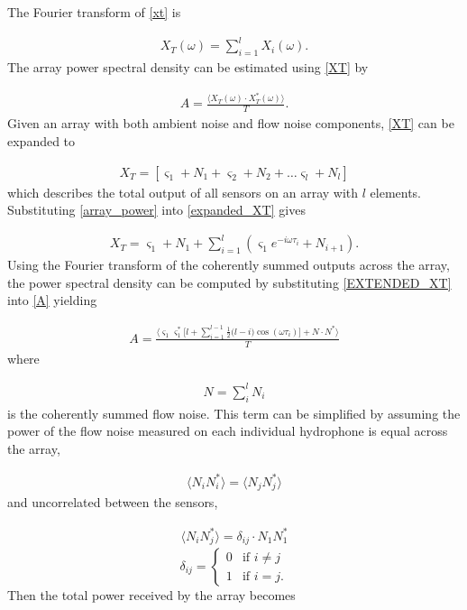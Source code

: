 \documentclass[12pt,journal,onecolumn]{IEEEtran}
\begin{document}
The Fourier transform of \eqref{xt} is 

\begin{align}
X_T(\omega) = \sum_{i = 1}^{l} X_i(\omega).
\label{XT}
\end{align}
The array power spectral density can be estimated using \eqref{XT} by

\begin{align}
A = \frac{\langle X_T(\omega) \cdot X^*_T(\omega) \rangle}{T}.
\label{A}
\end{align}
Given an array with both ambient noise and flow noise components, \eqref{XT} can be expanded to

\begin{align}
X_T = [ \varsigma_1 + N_1 + \varsigma_2 + N_2 + \dots \varsigma_l + N_l ]
\label{expanded_XT}
\end{align}
which describes the total output of all sensors on an array with $l$ elements. Substituting \eqref{array_power} into \eqref{expanded_XT} gives

\begin{align}
X_T = \varsigma_1 + N_1 + \sum_{i=1}^{l}( \varsigma_1 e^{-i \omega \tau_{i}} + N_{i+1}).
\label{EXTENDED_XT}
\end{align}
Using the Fourier transform of the coherently summed outputs across the array, the power spectral density can be computed by substituting \eqref{EXTENDED_XT} into \eqref{A} yielding

\begin{align}
A =\frac{\langle \varsigma_1\varsigma^*_1 \Big [ l + \sum \limits_{i=1}^{l-1}\frac{1}{2}\Big (l - i \Big )\cos(\omega \tau_{i}) \Big ] + N\cdot N^* \rangle}{T}
\label{A_expanded}
\end{align}
where

\begin{align}
N = \sum_{i}^{l} N_i 
\label{N}
\end{align}
is the coherently summed flow noise. This term can be simplified by assuming the power of the flow noise measured on each individual hydrophone is equal across the array, 

\begin{align}
\langle N_i N^*_i \rangle = \langle N_j N^*_j \rangle 
\label{assume}
\end{align}
and uncorrelated between the sensors,

\begin{align}
\langle N_i N^*_j \rangle = \delta_{ij} \cdot N_1 N^*_1
\label{ASSUME}
\end{align} 
\[
\delta_{ij}=
\begin{cases}
0&\text{if }i\neq j\,\\
1 &\text{if }i=j.
\end{cases}
\]
Then the total power received by the array becomes 
\end{document}
